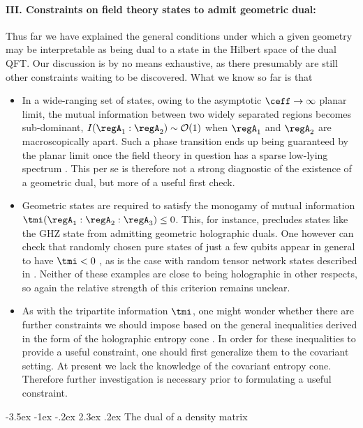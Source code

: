 \documentclass[12pt,openany]{book}
\makeatletter
\renewcommand\section{\@startsection {section}{1}{\z@}%
                                   {-3.5ex \@plus -1ex \@minus -.2ex}%
                                   {2.3ex \@plus.2ex}%
                                   {\normalfont\large\bfseries}}
\makeatother
\begin{document}
\paragraph{III. Constraints on field theory states to admit geometric dual:} Thus far we have explained the general conditions under which a given geometry may be interpretable as being dual to a state in the Hilbert space of the dual QFT. Our discussion is by no means exhaustive, as there presumably are still other constraints waiting to be discovered. What we know so far is that
\begin{itemize}
\item In a wide-ranging set of states, owing to the asymptotic $\ceff \to \infty$ planar limit, the mutual information between two widely separated regions becomes sub-dominant, $I(\regA_1: \regA_2 ) \sim {\cal O}(1)$ when $\regA_1$ and $\regA_2$ are macroscopically apart. Such a phase transition ends up being guaranteed by the planar limit once the field theory in question has a sparse low-lying spectrum \cite{Headrick:2010zt}. This per se is therefore not a strong diagnostic of the existence of a geometric dual, but more of a useful first check.
\item Geometric states are required to satisfy the monogamy of mutual information $\tmi(\regA_1 : \regA_2 :\regA_3) \leq 0$. This, for instance, precludes states like the GHZ state from admitting geometric holographic duals. One however can check that randomly chosen pure states of just a few qubits appear  in general to have $\tmi < 0$ \cite{Rangamani:2015qwa}, as is the case with random tensor network states described in \cite{Hayden:2016cfa}. Neither of these examples are close to being holographic in other respects, so again the relative strength of this criterion remains unclear.
\item As with the tripartite information $\tmi$, one might wonder whether there are further constraints we should impose based on the general inequalities derived in the form of the holographic entropy cone \cite{Bao:2015bfa}. In order for these inequalities to provide a useful constraint, one should first generalize them to the covariant setting. At present we lack the knowledge of  the covariant entropy cone. Therefore further investigation is necessary prior to formulating a useful constraint.
\end{itemize}




\section{The dual of a density matrix}
\label{sec:dendual}
\end{document}
